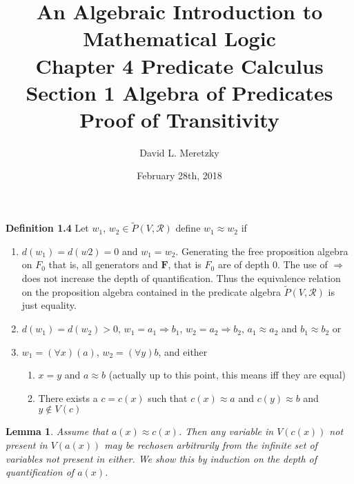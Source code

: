 \documentclass{article}
\title{ \vspace{-10ex} %
An Algebraic Introduction to Mathematical Logic\\
Chapter 4 Predicate Calculus \\
Section 1 Algebra of Predicates \\
Proof of Transitivity 
}
\author{David L. Meretzky
}
\date{%
February 28th, 2018
}
\theoremstyle{problemstyle}
\theoremstyle{lemmastyle}
\newtheorem{lemma}{Lemma}
\theoremstyle{theoremstyle}
\begin{document}
\maketitle

\begin{flushleft}
\textbf{Definition 1.4} Let $w_1$, $w_2 \in \widetilde{P}(V,\mathscr{R})$ define $w_1 \approx w_2$ if

\begin{enumerate}
\item $d(w_1) = d(w2) = 0$ and $w_1 = w_2$. Generating the free proposition algebra on $F_0$ that is, all generators and $\textbf{F}$, that is $F_0$ are of depth 0. The use of $\Rightarrow$ does not increase the depth of quantification. Thus the equivalence relation on the proposition algebra contained in the predicate algebra $\widetilde{P}(V,\mathscr{R})$ is just equality. 
\item $d(w_1) = d(w_2) > 0$, $w_1 = a_1 \Rightarrow b_1$, $w_2 = a_2 \Rightarrow b_2$, $a_1 \approx a_2$ and $b_1 \approx b_2$ or 
\item $w_1 = (\forall x)(a)$, $w_2 = (\forall y)b$, and either
\begin{enumerate}
\item $x = y$ and $a \approx b$   (actually up to this point, this means iff they are equal)
\item There exists a $c = c(x)$ such that $c(x) \approx a$ and $c(y) \approx b$ and $y \notin V(c)$ 
\end{enumerate}
\end{enumerate}
\end{flushleft}

\begin{lemma}
Assume that $a(x) \approx c(x)$. Then any variable in $V(c(x))$ not present in $V(a(x))$ may be rechosen arbitrarily from the infinite set of variables not present in either.  We show this by induction on the depth of quantification of $a(x)$.
\end{lemma}
\end{document}
